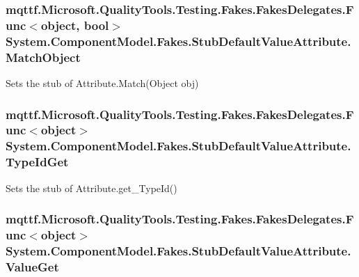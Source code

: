 \hypertarget{class_system_1_1_component_model_1_1_fakes_1_1_stub_default_value_attribute_a6974847329329947461672246782ffcf}{
\subsubsection[{Match\-Object}]{\setlength{\rightskip}{0pt plus 5cm}mqttf.\-Microsoft.\-Quality\-Tools.\-Testing.\-Fakes.\-Fakes\-Delegates.\-Func$<$object, bool$>$ System.\-Component\-Model.\-Fakes.\-Stub\-Default\-Value\-Attribute.\-Match\-Object}}\label{class_system_1_1_component_model_1_1_fakes_1_1_stub_default_value_attribute_a6974847329329947461672246782ffcf}


Sets the stub of Attribute.\-Match(\-Object obj)

\hypertarget{class_system_1_1_component_model_1_1_fakes_1_1_stub_default_value_attribute_a67d4ebc8b914a9c51c2b4118d8124744}{
\subsubsection[{Type\-Id\-Get}]{\setlength{\rightskip}{0pt plus 5cm}mqttf.\-Microsoft.\-Quality\-Tools.\-Testing.\-Fakes.\-Fakes\-Delegates.\-Func$<$object$>$ System.\-Component\-Model.\-Fakes.\-Stub\-Default\-Value\-Attribute.\-Type\-Id\-Get}}\label{class_system_1_1_component_model_1_1_fakes_1_1_stub_default_value_attribute_a67d4ebc8b914a9c51c2b4118d8124744}


Sets the stub of Attribute.\-get\-\_\-\-Type\-Id()

\hypertarget{class_system_1_1_component_model_1_1_fakes_1_1_stub_default_value_attribute_a4757fb7474efae65108451ec67f712c6}{
\subsubsection[{Value\-Get}]{\setlength{\rightskip}{0pt plus 5cm}mqttf.\-Microsoft.\-Quality\-Tools.\-Testing.\-Fakes.\-Fakes\-Delegates.\-Func$<$object$>$ System.\-Component\-Model.\-Fakes.\-Stub\-Default\-Value\-Attribute.\-Value\-Get}}\label{class_system_1_1_component_model_1_1_fakes_1_1_stub_default_value_attribute_a4757fb7474efae65108451ec67f712c6}



